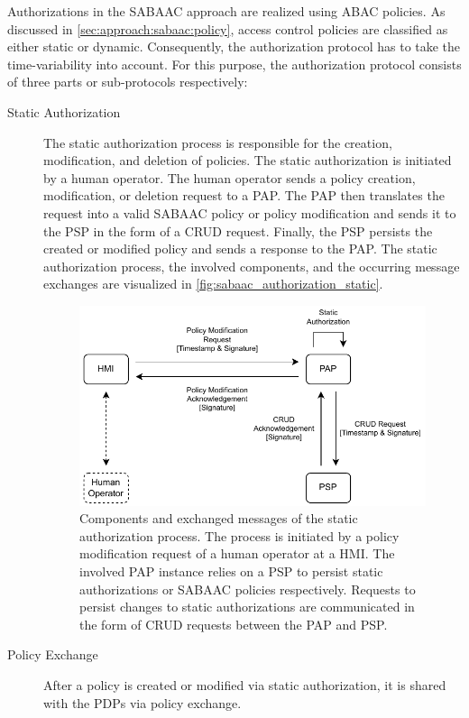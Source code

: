Authorizations in the SABAAC approach are realized using ABAC policies.
As discussed in \autoref{sec:approach:sabaac:policy}, access control policies are classified as either static or dynamic.
Consequently, the authorization protocol has to take the time-variability into account.
For this purpose, the authorization protocol consists of three parts or sub-protocols respectively:
\begin{description}
    \item[Static Authorization] The static authorization process is responsible for the creation, modification, and deletion of policies.
    The static authorization is initiated by a human operator.
    The human operator sends a policy creation, modification, or deletion request to a PAP.
    The PAP then translates the request into a valid SABAAC policy or policy modification and sends it to the PSP in the form of a CRUD request.
    Finally, the PSP persists the created or modified policy and sends a response to the PAP.
    The static authorization process, the involved components, and the occurring message exchanges are visualized in \autoref{fig:sabaac_authorization_static}.
    \begin{figure}
        \centering
        \includegraphics[width=0.9\linewidth]{figures/SABAAC_protocols_authorization_static.drawio.pdf}
        \caption{Components and exchanged messages of the static authorization process. The process is initiated by a policy modification request of a human operator at a HMI. The involved PAP instance relies on a PSP to persist static authorizations or SABAAC policies respectively. Requests to persist changes to static authorizations are communicated in the form of CRUD requests between the PAP and PSP.}
        \label{fig:sabaac_authorization_static}
    \end{figure}
    \item[Policy Exchange] After a policy is created or modified via static authorization, it is shared with the PDPs via policy exchange.

\end{description}
